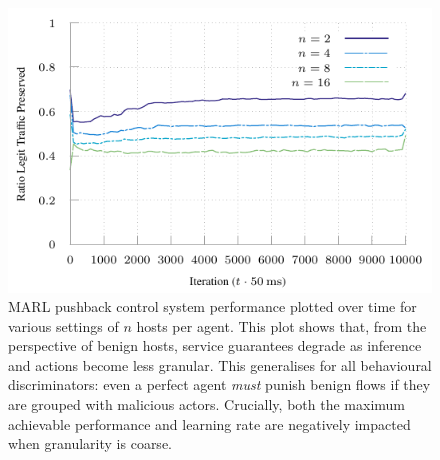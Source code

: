 \documentclass[conference, letterpaper, 10pt, times]{IEEEtran}
\begin{document}
\begin{figure}
	\centering
	\includegraphics[width=0.90\linewidth]{../plots/online-varyN-binary}
	\caption{
		MARL pushback control system performance plotted over time for various settings of $n$ hosts per agent.
		This plot shows that, from the perspective of benign hosts, service guarantees degrade as inference and actions become less granular.
		This generalises for all behavioural discriminators: even a perfect agent \emph{must} punish benign flows if they are grouped with malicious actors.
		Crucially, both the maximum achievable performance and learning rate are negatively impacted when granularity is coarse.
		\label{fig:marl-granularity}
	}
\end{figure}
\end{document}
